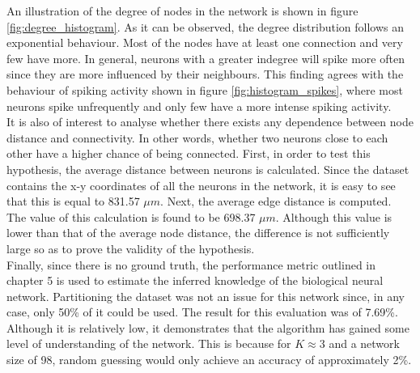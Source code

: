 An illustration of the degree of nodes in the network is shown in figure \ref{fig:degree_histogram}. As it can be observed, the degree distribution follows an exponential behaviour. Most of the nodes have at least one connection and very few have more. In general, neurons with a greater indegree will spike more often since they are more influenced by their neighbours. This finding agrees with the behaviour of spiking activity shown in figure \ref{fig:histogram_spikes}, where most neurons spike unfrequently and only few have a more intense spiking activity.\\

It is also of interest to analyse whether there exists any dependence between node distance and connectivity. In other words, whether two neurons close to each other have a higher chance of being connected. First, in order to test this hypothesis, the average distance between neurons is calculated. Since the dataset contains the x-y coordinates of all the neurons in the network, it is easy to see that this is equal to 831.57 \(\mu m\). Next, the average edge distance is computed. The value of this calculation is found to be 698.37 \(\mu m\). Although this value is lower than that of the average node distance, the difference is not sufficiently large so as to prove the validity of the hypothesis.\\

Finally, since there is no ground truth, the performance metric outlined in chapter 5 is used to estimate the inferred knowledge of the biological neural network. Partitioning the dataset was not an issue for this network since, in any case, only 50\% of it could be used. The result for this evaluation was of 7.69\%. Although it is relatively low, it demonstrates that the algorithm has gained some level of understanding of the network. This is because for \(K \approx 3\) and a network size of 98, random guessing would only achieve an accuracy of approximately 2\%.







